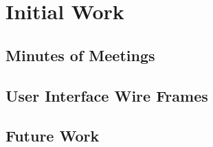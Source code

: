 \documentclass[11pt,a4paper]{article}
\begin{document}
\section{Initial Work}
\label{sec:initial-work}

\subsection{Minutes of Meetings}
\subsection{User Interface Wire Frames}
\subsection{Future Work}
\label{sec:future-work}
\end{document}

